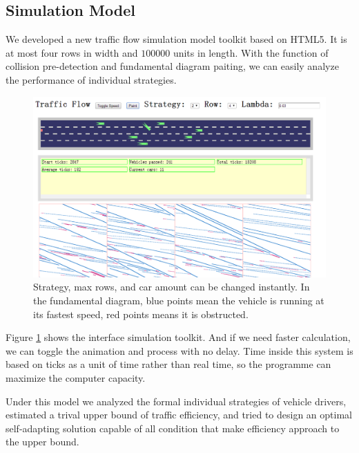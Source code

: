 \subsection{Simulation Model}
We developed a new traffic flow simulation model toolkit based on HTML5. 
It is at most four rows in width and $100000$ units in length. 
With the function of collision pre-detection and fundamental diagram paiting, we can easily analyze the performance of individual strategies. 
\begin{figure}[H]
  \centering
  \includegraphics[width=.6\textwidth]{./img/simulationmodel.png}
  \caption{Strategy, max rows, and car amount can be changed instantly. In the fundamental diagram, blue points mean the vehicle is running at its fastest speed, red points means it is obstructed. }
  \label{fig:simulationmodel}
\end{figure}
Figure \ref{fig:simulationmodel} shows the interface simulation toolkit. 
And if we need faster calculation, we can toggle the animation and process with no delay. 
Time inside this system is based on ticks as a unit of time rather than real time, so the programme can maximize the computer capacity. 

Under this model we analyzed the formal individual strategies of vehicle drivers, estimated a trival upper bound of traffic efficiency, and tried to design an optimal self-adapting solution capable of all condition that make efficiency approach to the upper bound. 

